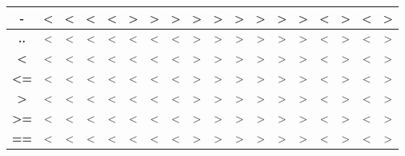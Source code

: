 \documentclass[a4paper, 12pt]{article}
\begin{document}
\begin{table}[!ht]
\begin{tabular}{|c|c|c|c|c|c|c|c|c|c|c|c|c|c|c|c|c|c|}
\textbf{-}               & \textless{}    & \textless{}    & \textless{}    & \textless{}    & \textgreater{} & \textgreater{} & \textgreater{} & \textgreater{}       & \textgreater{}        & \textgreater{}          & \textgreater{}           & \textgreater{} & \textgreater{}   & \textless{} & \textgreater{} & \textless{} & \textgreater{} \\ \hline
\textbf{..}              & \textless{}    & \textless{}    & \textless{}    & \textless{}    & \textless{}    & \textless{}    & \textless{}    & \textgreater{}       & \textgreater{}        & \textgreater{}          & \textgreater{}           & \textgreater{} & \textgreater{}   & \textless{} & \textgreater{} & \textless{} & \textgreater{} \\ \hline
\textbf{\textless{}}     & \textless{}    & \textless{}    & \textless{}    & \textless{}    & \textless{}    & \textless{}    & \textless{}    & \textgreater{}       & \textgreater{}        & \textgreater{}          & \textgreater{}           & \textgreater{} & \textgreater{}   & \textless{} & \textgreater{} & \textless{} & \textgreater{} \\ \hline
\textbf{\textless{}=}    & \textless{}    & \textless{}    & \textless{}    & \textless{}    & \textless{}    & \textless{}    & \textless{}    & \textgreater{}       & \textgreater{}        & \textgreater{}          & \textgreater{}           & \textgreater{} & \textgreater{}   & \textless{} & \textgreater{} & \textless{} & \textgreater{} \\ \hline
\textbf{\textgreater{}}  & \textless{}    & \textless{}    & \textless{}    & \textless{}    & \textless{}    & \textless{}    & \textless{}    & \textgreater{}       & \textgreater{}        & \textgreater{}          & \textgreater{}           & \textgreater{} & \textgreater{}   & \textless{} & \textgreater{} & \textless{} & \textgreater{} \\ \hline
\textbf{\textgreater{}=} & \textless{}    & \textless{}    & \textless{}    & \textless{}    & \textless{}    & \textless{}    & \textless{}    & \textgreater{}       & \textgreater{}        & \textgreater{}          & \textgreater{}           & \textgreater{} & \textgreater{}   & \textless{} & \textgreater{} & \textless{} & \textgreater{} \\ \hline
\textbf{==}              & \textless{}    & \textless{}    & \textless{}    & \textless{}    & \textless{}    & \textless{}    & \textless{}    & \textgreater{}       & \textgreater{}        & \textgreater{}          & \textgreater{}           & \textgreater{} & \textgreater{}   & \textless{} & \textgreater{} & \textless{} & \textgreater{} \\ \hline

\end{tabular}
\end{table}
\end{document}
